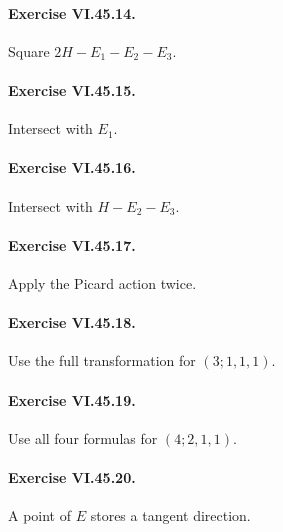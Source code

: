 \paragraph{Exercise VI.45.14.}
\begin{hint}
Square \(2H-E_1-E_2-E_3\).
\end{hint}

\paragraph{Exercise VI.45.15.}
\begin{hint}
Intersect with \(E_1\).
\end{hint}

\paragraph{Exercise VI.45.16.}
\begin{hint}
Intersect with \(H-E_2-E_3\).
\end{hint}

\paragraph{Exercise VI.45.17.}
\begin{hint}
Apply the Picard action twice.
\end{hint}

\paragraph{Exercise VI.45.18.}
\begin{hint}
Use the full transformation for \((3;1,1,1)\).
\end{hint}

\paragraph{Exercise VI.45.19.}
\begin{hint}
Use all four formulas for \((4;2,1,1)\).
\end{hint}

\paragraph{Exercise VI.45.20.}
\begin{hint}
A point of \(E\) stores a tangent direction.
\end{hint}

